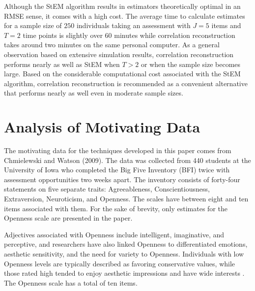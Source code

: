 \documentclass[12pt]{article}
\begin{document}
Although the StEM algorithm results in estimators theoretically optimal in an RMSE sense, it comes with a high cost. The average time to calculate estimates for a sample size of $250$ individuals taking an assessment with $J = 5$ items and $T = 2$ time points is slightly over $60$ minutes while correlation reconstruction takes around two minutes on the same personal computer. As a general observation based on extensive simulation results, correlation reconstruction performs nearly as well as StEM when $T>2$ or when the sample size becomes large. Based on the considerable computational cost associated with the StEM algorithm, correlation reconstruction is recommended as a convenient alternative that performs nearly as well even in moderate sample sizes.

\section{Analysis of Motivating Data}

The motivating data for the techniques developed in this paper comes from Chmielewski and Watson (2009). The data was collected from 440 students at
the University of Iowa who completed the Big Five Inventory (BFI) twice with assessment opportunities two weeks apart. The
inventory consists of forty-four statements on five separate traits:
Agreeableness, Conscientiousness, Extraversion, Neuroticism, and Openness.
The scales have between eight and ten items associated with them. For the
sake of brevity, only estimates for the Openness scale are presented in the paper.

Adjectives associated with Openness include intelligent, imaginative, and
perceptive, and researchers have also linked Openness to differentiated
emotions, aesthetic sensitivity, and the need for variety to Openness.
Individuals with low Openness levels are typically described as favoring
conservative values, while those rated high tended to enjoy aesthetic
impressions and have wide interests \cite{McCrae87}. The Openness scale has
a total of ten items.
\end{document}
